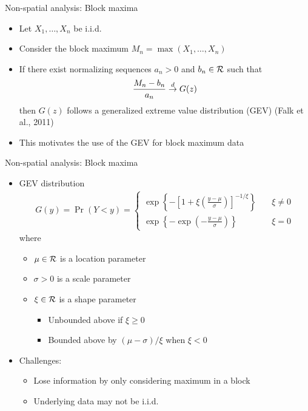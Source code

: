 \documentclass{beamer}
\begin{document}
\begin{frame}{Non-spatial analysis: Block maxima}
  \begin{itemize} \setlength{\itemsep}{1em}
    \item Let $X_1, \ldots, X_n$ be i.i.d.
    \item Consider the block maximum $M_n = \max(X_1, \ldots, X_n)$
    \item If there exist normalizing sequences $a_n > 0$ and $b_n \in {\cal R}$ such that
    \begin{align*}
      \frac{ M_n - b_n }{ a_n } \stackrel{d}{\rightarrow} G(z)
    \end{align*}
    then $G(z)$ follows a generalized extreme value distribution (GEV) (Falk et al., 2011)
    \item This motivates the use of the GEV for block maximum data
  \end{itemize}
\end{frame}

\begin{frame}{Non-spatial analysis: Block maxima}
  \begin{itemize} \setlength{\itemsep}{1em}
    \item GEV distribution
    \begin{align*}
      G(y) = \Pr(Y < y) = \left\{  \begin{array}{ll}
        \exp\left\{ -\left[ 1 + \xi \left( \frac{ y - \mu }{ \sigma } \right) \right]^{ -1 / \xi} \right\} & \quad \xi \neq 0 \\[0.5em]
        \exp \left\{ -\exp \left( - \frac{ y - \mu }{ \sigma} \right) \right\} & \quad \xi = 0
      \end{array}\right.
    \end{align*}
    where
    \begin{itemize} \setlength{\itemsep}{0.25em}
      \item $\mu \in {\cal R}$ is a location parameter
      \item $\sigma > 0$ is a scale parameter
      \item $\xi \in {\cal R}$ is a shape parameter
      \begin{itemize}
        \item Unbounded above if $\xi \ge 0$
        \item Bounded above by $(\mu - \sigma) / \xi$ when $\xi < 0$
      \end{itemize}
    \end{itemize}
    \item Challenges:
    \begin{itemize}
      \item Lose information by only considering maximum in a block
      \item Underlying data may not be i.i.d.
    \end{itemize}
  \end{itemize}
\end{frame}
\end{document}
